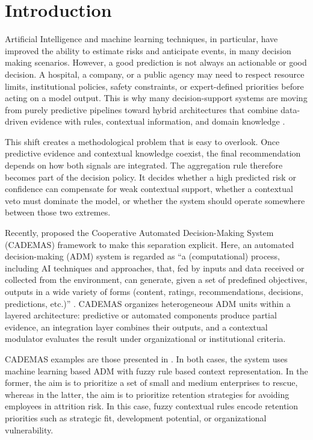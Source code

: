 \documentclass[mathematics,article,submit,moreauthors]{Definitions/mdpi}
\begin{document}
\section{Introduction}

Artificial Intelligence and machine learning techniques, in particular, have improved the ability to estimate risks and anticipate events, in many decision making scenarios. 
However, a good prediction is not always an actionable or good decision. A hospital, a company, or a public agency may need to respect resource limits, institutional policies, safety constraints, or expert-defined priorities before acting on a model output. This is why many decision-support systems are moving from purely predictive pipelines toward hybrid architectures that combine data-driven evidence with rules, contextual information, and domain knowledge \citep{Kierner2023,Rahman2025,PerezDominguez2024}.

This shift creates a methodological problem that is easy to overlook. Once predictive evidence and contextual knowledge coexist, the final recommendation depends on how both signals are integrated. The aggregation rule therefore becomes part of the decision policy. It decides whether a high predicted risk or confidence can compensate for weak contextual support, whether a contextual veto must dominate the model, or whether the system should operate somewhere between those two extremes.


Recently, \citet{NovoaHernandez2026} proposed the Cooperative Automated Decision-Making System (CADEMAS) framework to make this separation explicit. Here, an automated decision-making (ADM) system is regarded as ``a (computational) process, including AI techniques and approaches, that, fed by inputs and data received or collected from the environment, can generate, given a set of predefined objectives, outputs in a wide variety of forms (content, ratings, recommendations, decisions, predictions, etc.)'' \cite{ELI_ADM_Principles_2022}. CADEMAS organizes heterogeneous ADM units within a layered architecture: predictive or automated components produce partial evidence, an integration layer combines their outputs, and a contextual modulator evaluates the result under organizational or institutional criteria.

CADEMAS examples are those presented in \citep{NovoaHernandez2026, Godz2026}. In both cases, the system uses machine learning based ADM with fuzzy rule based context representation. In the former, the aim is to prioritize a set of small and medium enterprises to rescue, whereas in the latter, the aim is to prioritize retention strategies for avoiding employees in attrition risk. In this case, 
fuzzy contextual rules encode retention priorities such as strategic fit, development potential, or organizational vulnerability.
\end{document}
